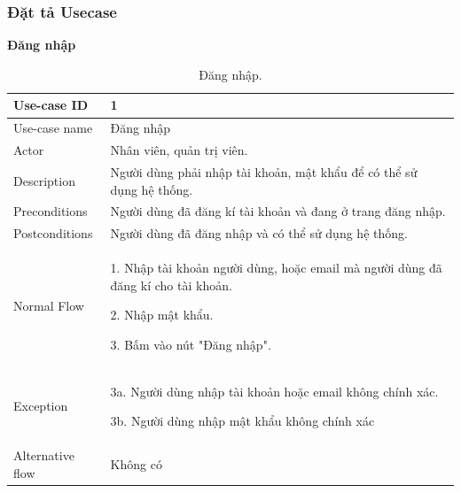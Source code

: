 \subsubsection{Đặt tả Usecase}
\textbf{Đăng nhập}
\begin{table}[!htp]
    \centering
    \begin{tabular}{|m{3cm}|m{10cm}|}
    \hline 
        Use-case ID & 1\\ \hline
        Use-case name & Đăng nhập\\ \hline
        Actor & Nhân viên, quản trị viên.\\ \hline
        Description & Người dùng phải nhập tài khoản, mật khẩu để có thể sử dụng hệ thống.\\ \hline
        Preconditions & Người dùng đã đăng kí tài khoản và đang ở trang đăng nhập.\\ \hline
        Postconditions & Người dùng đã đăng nhập và có thể sử dụng hệ thống.\\ \hline
        Normal Flow & 
        1. Nhập tài khoản người dùng, hoặc email mà người dùng đã đăng kí cho tài khoản.\par
        2. Nhập mật khẩu.\par
        3. Bấm vào nút "Đăng nhập".
        \\ \hline
        Exception & 
        3a. Người dùng nhập tài khoản hoặc email không chính xác.\par
        3b. Người dùng nhập mật khẩu không chính xác
        \\ \hline
        Alternative flow & Không có\\ 
    \hline 
    \end{tabular}
    \caption{Đăng nhập.}
    \label{bang1}
\end{table}

